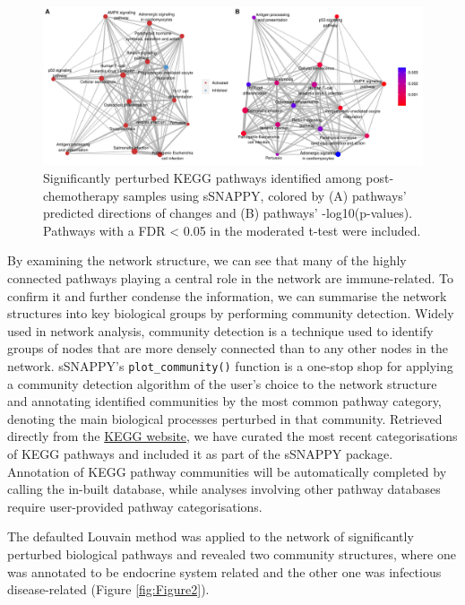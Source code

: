 \documentclass[9pt,a4paper,]{extarticle}
\begin{document}
\begin{figure}

{\centering \includegraphics[width=1\linewidth]{sSNAPPY_paper_files/figure-latex/Figure1-1} 

}

\caption{Significantly perturbed KEGG pathways identified among post-chemotherapy samples using sSNAPPY, colored by (A) pathways’ predicted directions of changes and (B) pathways’ -log10(p-values). Pathways with a FDR < 0.05 in the moderated t-test were included.}\label{fig:Figure1}
\end{figure}

By examining the network structure, we can see that many of the highly connected pathways playing a central role in the network are immune-related. To confirm it and further condense the information, we can summarise the network structures into key biological groups by performing community detection. Widely used in network analysis, community detection is a technique used to identify groups of nodes that are more densely connected than to any other nodes in the network\citep{Newman2004}. sSNAPPY's \texttt{plot\_community()} function is a one-stop shop for applying a community detection algorithm of the user's choice to the network structure and annotating identified communities by the most common pathway category, denoting the main biological processes perturbed in that community. Retrieved directly from the \href{https://www.genome.jp/kegg/pathway.html}{KEGG website}, we have curated the most recent categorisations of KEGG pathways and included it as part of the sSNAPPY package. Annotation of KEGG pathway communities will be automatically completed by calling the in-built database, while analyses involving other pathway databases require user-provided pathway categorisations.

The defaulted Louvain method was applied to the network of significantly perturbed biological pathways and revealed two community structures, where one was annotated to be endocrine system related and the other one was infectious disease-related (Figure \ref{fig:Figure2}).
\end{document}
